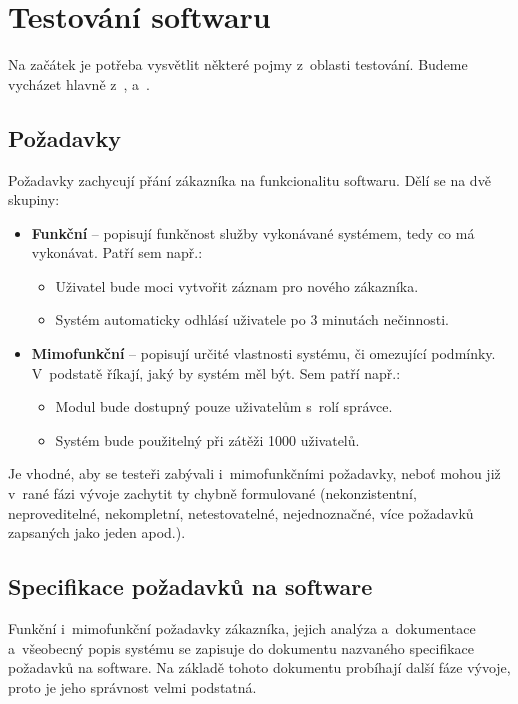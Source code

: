 \chapter{Testování softwaru}
Na začátek je potřeba vysvětlit některé pojmy z~oblasti testování. Budeme vycházet hlavně z~\citep{RizeniKvalitySW}, \citep{Patton} a~\citep{Herout}.

	\section{Požadavky}
	Požadavky zachycují přání zákazníka na funkcionalitu softwaru. Dělí se na dvě skupiny:
		\begin{itemize}
			\item \textbf{Funkční} -- popisují funkčnost služby vykonávané systémem, tedy co má vykonávat. Patří sem např.:
				\begin{itemize}
					\item Uživatel bude moci vytvořit záznam pro nového zákazníka.
					\item Systém automaticky odhlásí uživatele po 3 minutách nečinnosti.
				\end{itemize}
			\item \textbf{Mimofunkční} -- popisují určité vlastnosti systému, či omezující podmínky. V~podstatě říkají, jaký by systém měl být. Sem patří např.:
				\begin{itemize}
					\item Modul  bude dostupný pouze uživatelům s~rolí správce.
					\item Systém bude použitelný při zátěži 1000 uživatelů.
				\end{itemize}
		\end{itemize}
	
	Je vhodné, aby se testeři zabývali i~mimofunkčními požadavky, neboť mohou již v~rané fázi vývoje zachytit ty chybně formulované (nekonzistentní, neproveditelné, nekompletní, netestovatelné, nejednoznačné, více požadavků zapsaných jako jeden apod.).
	
	\section{Specifikace požadavků na software}
	Funkční i~mimofunkční požadavky zákazníka, jejich analýza a~dokumentace a~všeobecný popis systému se zapisuje do dokumentu nazvaného specifikace požadavků na software. Na základě tohoto dokumentu probíhají další fáze vývoje, proto je jeho správnost velmi podstatná.
	
